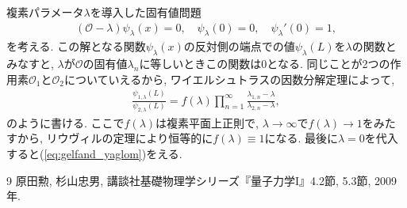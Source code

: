 \documentclass{ltjsarticle}
\theoremstyle{definition}
\begin{document}
複素パラメータ$\lambda$を導入した固有値問題
\begin{align}
  \left( \mathcal{O} - \lambda \right) \psi_\lambda(x) = 0,\quad \psi_\lambda(0) = 0, \quad \psi_\lambda'(0) = 1,
\end{align}
を考える. この解となる関数$\psi_\lambda(x)$の反対側の端点での値$\psi_\lambda(L)$を$\lambda$の関数とみなすと, $\lambda$が$\mathcal O$の固有値$\lambda_n$に等しいときこの関数は0となる. 同じことが2つの作用素$\mathcal O_1$と$\mathcal O_2$についていえるから, ワイエルシュトラスの因数分解定理によって,
\begin{align}
  \frac{\psi_{1, \lambda}(L)}{\psi_{2, \lambda}(L)} = f(\lambda) \prod_{n=1}^{\infty} \frac{\lambda_{1, n} - \lambda}{\lambda_{2, n} - \lambda},
\end{align}
のように書ける. ここで$f(\lambda)$は複素平面上正則で, $\lambda\to\infty$で$f(\lambda)\to1$をみたすから, リウヴィルの定理により恒等的に$f(\lambda)\equiv1$になる. 最後に$\lambda=0$を代入すると(\ref{eq:gelfand_yaglom})をえる.

\begin{thebibliography}{9}
  \bibitem{} 原田勲, 杉山忠男, 講談社基礎物理学シリーズ『量子力学I』4.2節, 5.3節, 2009年.
\end{thebibliography}
\end{document}
